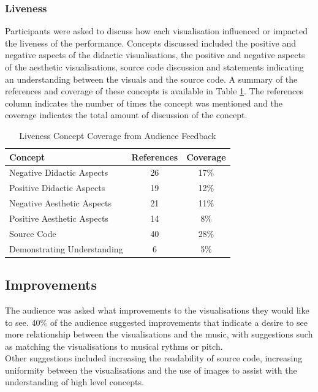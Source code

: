 \documentclass{article}
\begin{document}
\subsubsection{Liveness}

Participants were asked to discuss how each visualisation influenced or impacted the liveness of the performance. Concepts discussed included the positive and negative aspects of the didactic visualisations, the positive and negative aspects of the aesthetic visualisations, source code discussion and statements indicating an understanding between the visuals and the source code. A summary of the references and coverage of these concepts is available in Table \ref{tab:livenesscoverage}. The references column indicates the number of times the concept was mentioned and the coverage indicates the total amount of discussion of the concept.

\begin{table}
\caption {Liveness Concept Coverage from Audience Feedback} \label{tab:livenesscoverage} 
\begin{center}
\begin{tabular}{ l | c c }

Concept&References&Coverage\\
\hline
Negative Didactic Aspects&26&17\%\\
Positive Didactic Aspects&19&12\%\\
Negative Aesthetic Aspects&21&11\%\\
Positive Aesthetic Aspects&14&8\%\\
Source Code&40&28\%\\
Demonstrating Understanding&6&5\%\\
\end{tabular}
\end{center}
\end{table}

\subsection{Improvements}

The audience was asked what improvements to the visualisations they would like to see. 40\% of the audience suggested improvements that indicate a desire to see more relationship between the visualisations and the music, with suggestions such as matching the visualisations to musical rythms or pitch.\\

Other suggestions included increasing the readability of source code,  increasing uniformity between the visualisations and the use of images to assist with the understanding of high level concepts.
\end{document}
